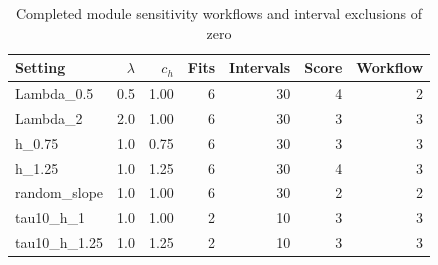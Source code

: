 \begin{table}[t]
\caption{Completed module sensitivity workflows and interval exclusions of zero}\label{tab:joint-module-sensitivity}
\centering\small
\begin{tabular}{lrrrrrr}
\toprule
Setting & $\lambda$ & $c_h$ & Fits & Intervals & Score & Workflow \\
\midrule
Lambda\_0.5 & 0.5 & 1.00 & 6 & 30 & 4 & 2 \\
Lambda\_2 & 2.0 & 1.00 & 6 & 30 & 3 & 3 \\
h\_0.75 & 1.0 & 0.75 & 6 & 30 & 3 & 3 \\
h\_1.25 & 1.0 & 1.25 & 6 & 30 & 4 & 3 \\
random\_slope & 1.0 & 1.00 & 6 & 30 & 2 & 2 \\
tau10\_h\_1 & 1.0 & 1.00 & 2 & 10 & 3 & 3 \\
tau10\_h\_1.25 & 1.0 & 1.25 & 2 & 10 & 3 & 3 \\
\bottomrule
\end{tabular}
\end{table}
